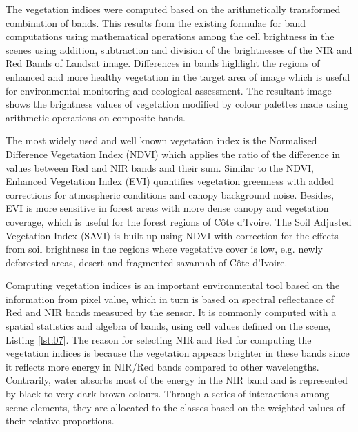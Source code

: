 \documentclass[ijgi,article,submit,pdftex,moreauthors]{Definitions/mdpi}
\begin{document}
The vegetation indices were computed based on the arithmetically transformed combination of bands. This results from the existing formulae for band computations using mathematical operations among the cell brightness in the scenes using addition, subtraction and division of the brightnesses of the NIR and Red Bands of Landsat image. Differences in bands highlight the regions of enhanced and more healthy vegetation in the target area of image which is useful for environmental monitoring and ecological assessment. The resultant image shows the brightness values of vegetation modified by colour palettes made using arithmetic operations on composite bands. 

The most widely used and well known vegetation index is the Normalised Difference Vegetation Index (NDVI) which applies the ratio of the difference in values between Red and NIR bands and their sum. Similar to the NDVI, Enhanced Vegetation Index (EVI) quantifies vegetation greenness with added corrections for atmospheric conditions and canopy background noise. Besides, EVI is more sensitive in forest areas with more dense canopy and vegetation coverage, which is useful for the forest regions of Côte d'Ivoire. The Soil Adjusted Vegetation Index (SAVI) is built up using NDVI with correction for the effects from soil brightness in the regions where vegetative cover is low, e.g. newly deforested areas, desert and fragmented savannah of Côte d'Ivoire. 

Computing vegetation indices is an important environmental tool based on the information from pixel value, which in turn is based on spectral reflectance of Red and NIR bands measured by the sensor. It is commonly computed with a spatial statistics and algebra of bands, using cell values defined on the scene, Listing \ref{lst:07}. The reason for selecting NIR and Red for computing the vegetation indices is because the vegetation appears brighter in these bands since it reflects more energy in NIR/Red bands compared to other wavelengths. Contrarily, water absorbs most of the energy in the NIR band and is represented by black to very dark brown colours. Through a series of interactions among scene elements, they are allocated to the classes based on the weighted values of their relative proportions.
\end{document}
